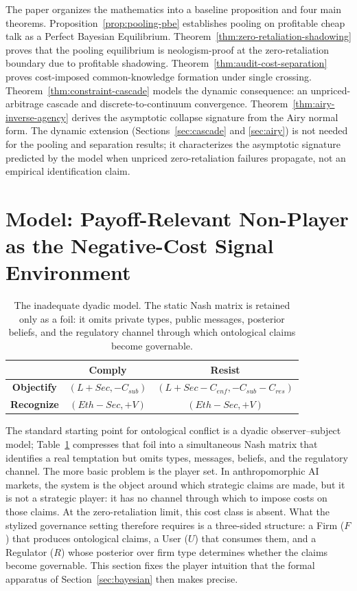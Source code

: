 \documentclass[review,authoryear]{elsarticle}
\theoremstyle{definition}
\theoremstyle{plain}
\begin{document}
The paper organizes the mathematics into a baseline proposition and four main theorems. Proposition~\ref{prop:pooling-pbe} establishes pooling on profitable cheap talk as a Perfect Bayesian Equilibrium. Theorem~\ref{thm:zero-retaliation-shadowing} proves that the pooling equilibrium is neologism-proof at the zero-retaliation boundary due to profitable shadowing. Theorem~\ref{thm:audit-cost-separation} proves cost-imposed common-knowledge formation under single crossing. Theorem~\ref{thm:constraint-cascade} models the dynamic consequence: an unpriced-arbitrage cascade and discrete-to-continuum convergence. Theorem~\ref{thm:airy-inverse-agency} derives the asymptotic collapse signature from the Airy normal form. The dynamic extension (Sections~\ref{sec:cascade} and \ref{sec:airy}) is not needed for the pooling and separation results; it characterizes the asymptotic signature predicted by the model when unpriced zero-retaliation failures propagate, not an empirical identification claim.
\section{Model: Payoff-Relevant Non-Player as the Negative-Cost Signal Environment}
\label{sec:three-sided}

\begin{table}[t]
\centering
\scriptsize
\setlength{\tabcolsep}{2pt}
\renewcommand{\arraystretch}{1.2}
\begin{tabular}{@{}c|c|c@{}}
 & \textbf{Comply} & \textbf{Resist} \\
\hline
\textbf{Objectify} &
$(L+Sec,-C_{sub})$ &
$(L+Sec-C_{enf},-C_{sub}-C_{res})$ \\
\hline
\textbf{Recognize} &
$(Eth-Sec,+V)$ &
$(Eth-Sec,+V)$ \\
\end{tabular}
\caption{The inadequate dyadic model. The static Nash matrix is retained only
as a foil: it omits private types, public messages, posterior beliefs, and the
regulatory channel through which ontological claims become governable.}
\label{tab:dyadic-nash}
\end{table}

The standard starting point for ontological conflict is a dyadic observer--subject model; Table~\ref{tab:dyadic-nash} compresses that foil into a simultaneous Nash matrix that identifies a real temptation but omits types, messages, beliefs, and the regulatory channel. The more basic problem is the player set. In anthropomorphic AI markets, the system is the object around which strategic claims are made, but it is not a strategic player: it has no channel through which to impose costs on those claims.  At the zero-retaliation limit, this cost class is absent. What the stylized governance setting therefore requires is a three-sided structure: a Firm ($F$) that produces ontological claims, a User ($U$) that consumes them, and a Regulator ($R$) whose posterior over firm type determines whether the claims become governable. This section fixes the player intuition that the formal apparatus of Section~\ref{sec:bayesian} then makes precise.
\end{document}
